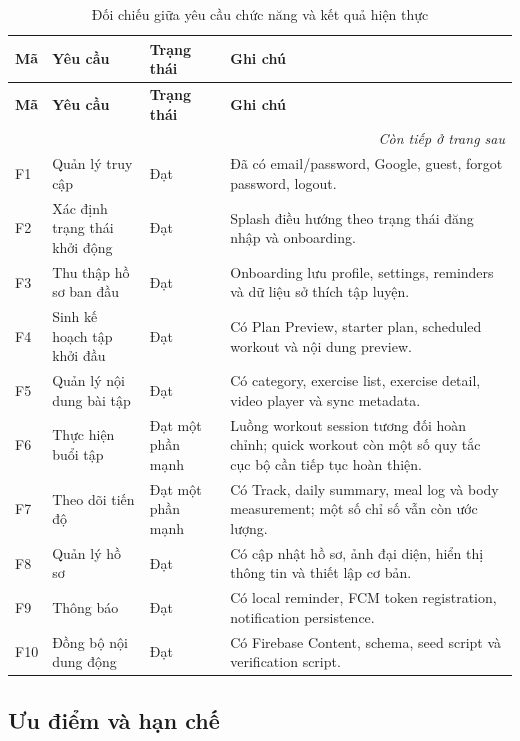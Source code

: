 \small
\begin{longtable}{|p{1.1cm}|p{3.8cm}|p{2.2cm}|p{5.1cm}|}
\caption{Đối chiếu giữa yêu cầu chức năng và kết quả hiện thực}
\label{tab:requirement-mapping}\\
\hline
\textbf{Mã} & \textbf{Yêu cầu} & \textbf{Trạng thái} & \textbf{Ghi chú} \\ \hline
\endfirsthead
\hline
\textbf{Mã} & \textbf{Yêu cầu} & \textbf{Trạng thái} & \textbf{Ghi chú} \\ \hline
\endhead
\hline
\multicolumn{4}{r}{\textit{Còn tiếp ở trang sau}} \\
\endfoot
\hline
\endlastfoot
F1 & Quản lý truy cập & Đạt & Đã có email/password, Google, guest, forgot password, logout. \\ \hline
F2 & Xác định trạng thái khởi động & Đạt & Splash điều hướng theo trạng thái đăng nhập và onboarding. \\ \hline
F3 & Thu thập hồ sơ ban đầu & Đạt & Onboarding lưu profile, settings, reminders và dữ liệu sở thích tập luyện. \\ \hline
F4 & Sinh kế hoạch tập khởi đầu & Đạt & Có Plan Preview, starter plan, scheduled workout và nội dung preview. \\ \hline
F5 & Quản lý nội dung bài tập & Đạt & Có category, exercise list, exercise detail, video player và sync metadata. \\ \hline
F6 & Thực hiện buổi tập & Đạt một phần mạnh & Luồng workout session tương đối hoàn chỉnh; quick workout còn một số quy tắc cục bộ cần tiếp tục hoàn thiện. \\ \hline
F7 & Theo dõi tiến độ & Đạt một phần mạnh & Có Track, daily summary, meal log và body measurement; một số chỉ số vẫn còn ước lượng. \\ \hline
F8 & Quản lý hồ sơ & Đạt & Có cập nhật hồ sơ, ảnh đại diện, hiển thị thông tin và thiết lập cơ bản. \\ \hline
F9 & Thông báo & Đạt & Có local reminder, FCM token registration, notification persistence. \\ \hline
F10 & Đồng bộ nội dung động & Đạt & Có Firebase Content, schema, seed script và verification script. \\ \hline
\end{longtable}
\normalsize

\subsection{Ưu điểm và hạn chế}

